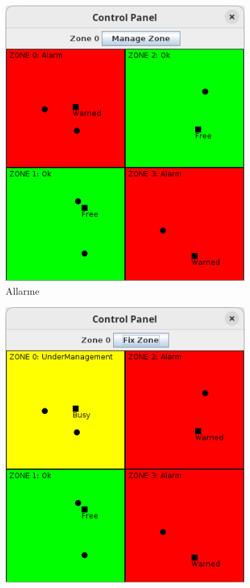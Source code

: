 \documentclass[12pt,a4paper,openright,twoside]{book}
\begin{document}
\begin{figure}
\begin{subfigure}[b]{0.3\textwidth}
         \includegraphics[width=\textwidth]{figures/distributed-programming-gui-alarm.png}
         \caption{Allarme}
         \label{fig:dpguib}
     \end{subfigure}
     \hfill
     \begin{subfigure}[b]{0.3\textwidth}
         \centering
         \includegraphics[width=\textwidth]{figures/distributed-programming-gui-management.png}

\end{subfigure}
\end{figure}
\end{document}
